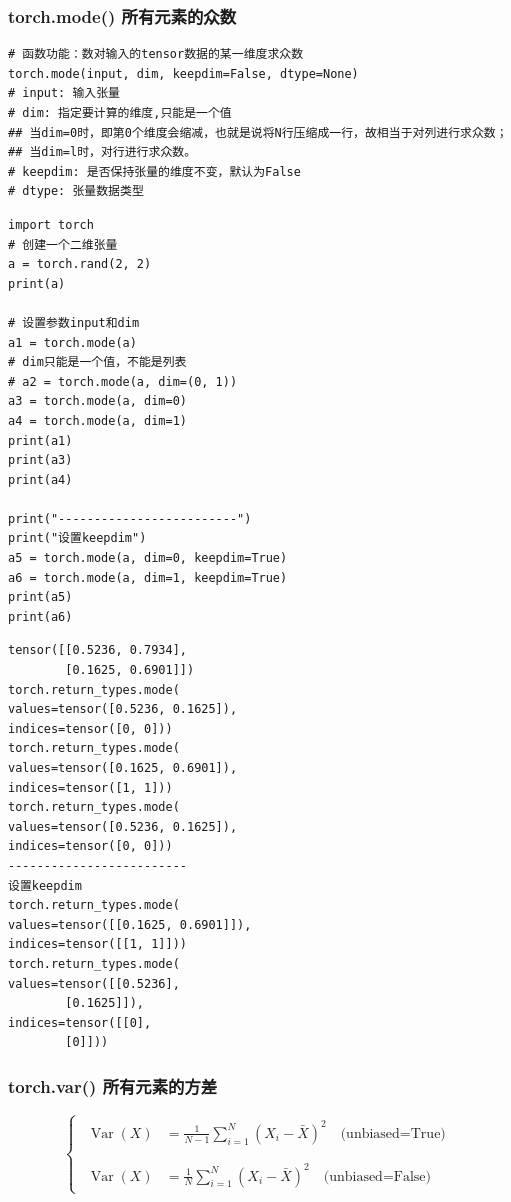 \subsubsection{torch.mode() 所有元素的众数}
\label{subsubsec:Pytorch-torch.mode}
\begin{lstlisting}[style=demostyle,numbers=none]
# 函数功能：数对输入的tensor数据的某一维度求众数
torch.mode(input, dim, keepdim=False, dtype=None)
# input: 输入张量
# dim: 指定要计算的维度,只能是一个值
## 当dim=0时，即第0个维度会缩减，也就是说将N行压缩成一行，故相当于对列进行求众数；
## 当dim=l时，对行进行求众数。
# keepdim: 是否保持张量的维度不变，默认为False
# dtype: 张量数据类型
\end{lstlisting}
\begin{lstlisting}[style=pythonstyle]
import torch
# 创建一个二维张量
a = torch.rand(2, 2)
print(a)

# 设置参数input和dim
a1 = torch.mode(a)
# dim只能是一个值，不能是列表
# a2 = torch.mode(a, dim=(0, 1)) 
a3 = torch.mode(a, dim=0)
a4 = torch.mode(a, dim=1)
print(a1)
print(a3)
print(a4)

print("-------------------------")
print("设置keepdim")
a5 = torch.mode(a, dim=0, keepdim=True)
a6 = torch.mode(a, dim=1, keepdim=True)
print(a5)
print(a6)
\end{lstlisting}
\begin{lstlisting}[style=demostyle,numbers=none]
tensor([[0.5236, 0.7934],
        [0.1625, 0.6901]])
torch.return_types.mode(
values=tensor([0.5236, 0.1625]),
indices=tensor([0, 0]))
torch.return_types.mode(
values=tensor([0.1625, 0.6901]),
indices=tensor([1, 1]))
torch.return_types.mode(
values=tensor([0.5236, 0.1625]),
indices=tensor([0, 0]))
-------------------------
设置keepdim
torch.return_types.mode(
values=tensor([[0.1625, 0.6901]]),
indices=tensor([[1, 1]]))
torch.return_types.mode(
values=tensor([[0.5236],
        [0.1625]]),
indices=tensor([[0],
        [0]]))
\end{lstlisting}  

\subsubsection{torch.var() 所有元素的方差}
\label{subsubsec:Pytorch-torch.var}
$$\left\{\begin{matrix}
        \begin{aligned}\operatorname{Var}(X)&=\frac1{N-1}\sum_{i=1}^N(X_i-\bar{X})^2\quad\text{(unbiased=True)}\\
        \\
        \\
        \operatorname{Var}(X)&=\frac1N\sum_{i=1}^N(X_i-\bar{X})^2\quad\text{(unbiased=False)}
        \end{aligned}
\end{matrix}\right.$$

